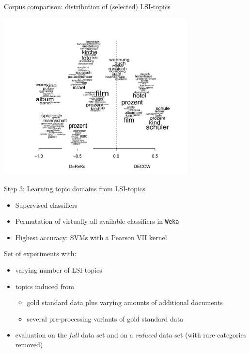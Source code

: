 \documentclass{beamer}
\begin{document}
\begin{frame}
  {Corpus comparison: distribution of (selected) LSI-topics}
  \begin{center}
    \includegraphics[width=0.75\textwidth]{topics-logratios2bw}
  \end{center}
\end{frame}




\begin{frame}
  {Step 3: Learning topic domains from LSI-topics}
  \begin{itemize}
    \item Supervised classifiers
    \item Permutation of virtually all available classifiers in \texttt{Weka}\\ \citep{HallWitten2011}
    \item Highest accuracy: SVMs with a Pearson VII kernel\\ \citep{UstunEa2006}
  \end{itemize}
  \vspace{.5cm}
\pause
Set of experiments with:
  \begin{itemize}
    \item varying number of LSI-topics
    \item topics induced from
      \begin{itemize} 
        \item gold standard data plus varying amounts of additional documents
        \item several pre-processing variants of gold standard data
      \end{itemize}
    \item evaluation on the \textit{full} data set and on a \textit{reduced} data set (with rare categories removed)
  \end{itemize}
\end{frame}
\end{document}
